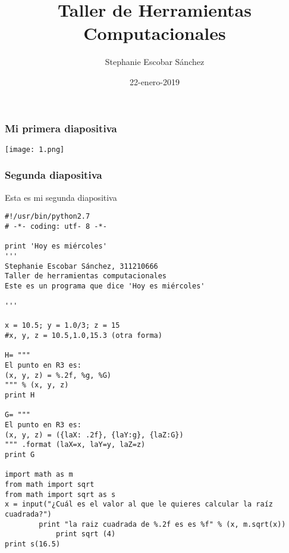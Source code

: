 \documentclass{beamer} %
\title{Taller de Herramientas Computacionales}
\author{Stephanie Escobar Sánchez}
\date{22-enero-2019}
\begin{document}
	\maketitle
	
\begin{frame}
	\frametitle{Mi primera diapositiva}
	\begin{center}
		\texttt{[image: 1.png]}
	\end{center}
		
\end{frame}

\begin{frame}

\transboxin

\frametitle{Segunda diapositiva}
Esta es mi segunda diapositiva

\end{frame}
\begin{frame}[fragile]
	\begin{verbatim}
#!/usr/bin/python2.7
# -*- coding: utf- 8 -*-

print 'Hoy es miércoles'
'''
Stephanie Escobar Sánchez, 311210666
Taller de herramientas computacionales
Este es un programa que dice 'Hoy es miércoles'

'''

x = 10.5; y = 1.0/3; z = 15
#x, y, z = 10.5,1.0,15.3 (otra forma)

H= """
El punto en R3 es:
(x, y, z) = %.2f, %g, %G)
""" % (x, y, z)
print H

G= """
El punto en R3 es:
(x, y, z) = ({laX: .2f}, {laY:g}, {laZ:G})
""" .format (laX=x, laY=y, laZ=z)
print G

import math as m
from math import sqrt
from math import sqrt as s
x = input("¿Cuál es el valor al que le quieres calcular la raíz cuadrada?")
		print "la raiz cuadrada de %.2f es es %f" % (x, m.sqrt(x))
			print sqrt (4)
print s(16.5)

	\end{verbatim}

\end{frame}
\end{document}
